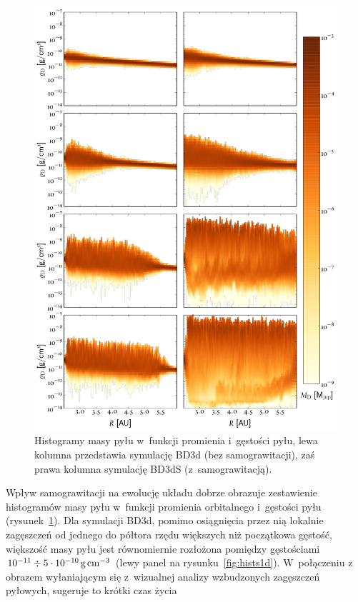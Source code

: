 \begin{figure} 
  \centering
  \includegraphics[height=0.9\textheight]{figures/hists2d}
  \caption{Histogramy masy pyłu w~funkcji promienia i~gęstości pyłu, lewa
  kolumna przedstawia symulację BD3d (bez samograwitacji), zaś prawa kolumna
  symulację BD3dS (z~samograwitacją).}
  \label{fig:hists} 
\end{figure}
%
Wpływ samograwitacji na ewolucję układu dobrze obrazuje zestawienie histogramów
masy pyłu w~funkcji promienia orbitalnego i~gęstości pyłu
(rysunek~\ref{fig:hists}). Dla symulacji BD3d, pomimo osiągnięcia przez nią
lokalnie zagęszczeń od jednego do półtora rzędu większych niż początkowa
gęstość, większość masy pyłu jest równomiernie rozłożona pomiędzy gęstościami
$10^{-11} \div 5\cdot10^{-10}\hbox{$\thinspace\textrm{g}$}\hbox{$\thinspace\textrm{cm}$}^{-3}$ (lewy panel na
rysunku~\ref{fig:hists1d}). W~połączeniu z obrazem wyłaniającym się z~wizualnej
analizy wzbudzonych zagęszczeń pyłowych, sugeruje to krótki czas życia
